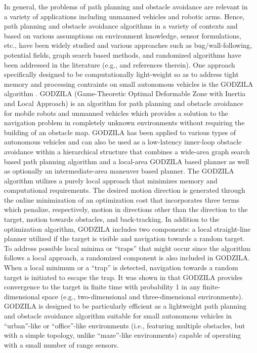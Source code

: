 \documentclass[10pt,conference]{ieeeconf}
\begin{document}
In general, the problems of path planning and obstacle avoidance are relevant
in a variety of applications including unmanned vehicles and robotic arms.
Hence, path planning and obstacle avoidance algorithms 
in a variety of contexts and based on various
assumptions on environment knowledge, sensor formulations, etc.,
have been widely
studied and various approaches such as 
bug/wall-following, potential fields, graph search based methods, and
randomized algorithms 
have been addressed in the literature (e.g.,
\cite{Lat91,HA92,RN09,HNR68,Lum88,NMU99,Kha85,RK92,Ste94,KSLO96,KK05b_jirs}
and references therein). One approach specifically designed to be
computationally light-weight so as to address tight memory and processing
contraints on small autonomous vehicles is the GODZILA algorithm
\cite{KK05b_jirs}. GODZILA (Game-Theoretic Optimal
Deformable Zone with Inertia and Local Approach) is an algorithm for path
planning and obstacle avoidance for mobile robots and unmanned vehicles which provides a
solution to the navigation problem in completely unknown environments
without requiring the building of an obstacle map. GODZILA has been applied to
various types of autonomous vehicles \cite{KKN08,KK09,KK11} and can also be
used as a low-latency inner-loop obstacle avoidance within a hierarchical
structure \cite{KKN08,KK09,KK11} that combines a wide-area graph search based path planning
algorithm and a local-area
GODZILA based planner as well as optionally an intermediate-area maneuver based planner. The GODZILA algorithm utilizes a
purely local approach that minimizes memory and computational requirements.   
The desired motion direction is generated through the online minimization of an optimization cost
that incorporates three terms which penalize, respectively, motion
in directions other than the direction to the target, motion towards
obstacles, and back-tracking.  In addition to the optimization
algorithm, GODZILA includes two components:
a local straight-line planner utilized if the target is visible
and  navigation towards a random target.  To address possible local minima or
``traps'' that might occur since the algorithm follows
a local approach, a randomized component is also included in GODZILA.
When a local minimum or a ``trap'' is detected, navigation towards a
random target is initiated to escape the trap.  It was shown in \cite{KK05b_jirs} that
GODZILA provides convergence to the target in finite time with
probability 1 in any finite-dimensional space (e.g., two-dimensional and
three-dimensional environments).  GODZILA is designed to
be particularly efficient as a lightweight path planning and obstacle
avoidance algorithm suitable for small autonomous vehicles in
``urban''-like or ``office''-like environments (i.e., featuring multiple obstacles, but
with a simple topology, unlike ``maze''-like environments) capable of
operating with a small number of range sensors.
\end{document}
